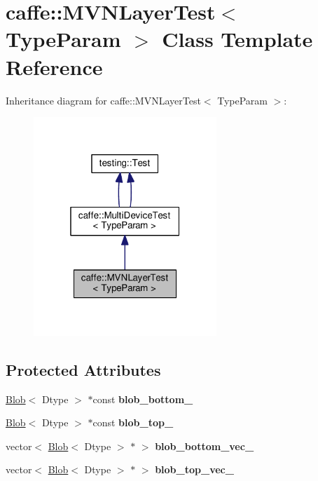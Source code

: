 \hypertarget{classcaffe_1_1_m_v_n_layer_test}{}\section{caffe\+:\+:M\+V\+N\+Layer\+Test$<$ Type\+Param $>$ Class Template Reference}
\label{classcaffe_1_1_m_v_n_layer_test}


Inheritance diagram for caffe\+:\+:M\+V\+N\+Layer\+Test$<$ Type\+Param $>$\+:
\nopagebreak
\begin{figure}[H]
\begin{center}
\leavevmode
\includegraphics[width=196pt]{classcaffe_1_1_m_v_n_layer_test__inherit__graph}
\end{center}
\end{figure}
\subsection*{Protected Attributes}
\begin{DoxyCompactItemize}
\item 
\mbox{\label{classcaffe_1_1_m_v_n_layer_test_ab14e73590a7004e93a62c1aeb59f55e0}} 
\mbox{\hyperlink{classcaffe_1_1_blob}{Blob}}$<$ Dtype $>$ $\ast$const {\bfseries blob\+\_\+bottom\+\_\+}
\item 
\mbox{\label{classcaffe_1_1_m_v_n_layer_test_a774fb72c75043b1a70f0479b84aff195}} 
\mbox{\hyperlink{classcaffe_1_1_blob}{Blob}}$<$ Dtype $>$ $\ast$const {\bfseries blob\+\_\+top\+\_\+}
\item 
\mbox{\label{classcaffe_1_1_m_v_n_layer_test_ad5d5a76f416d686cc004596cbad7d589}} 
vector$<$ \mbox{\hyperlink{classcaffe_1_1_blob}{Blob}}$<$ Dtype $>$ $\ast$ $>$ {\bfseries blob\+\_\+bottom\+\_\+vec\+\_\+}
\item 
\mbox{\label{classcaffe_1_1_m_v_n_layer_test_a558af4e6d5363e48b4b8e5c9b79c9864}} 
vector$<$ \mbox{\hyperlink{classcaffe_1_1_blob}{Blob}}$<$ Dtype $>$ $\ast$ $>$ {\bfseries blob\+\_\+top\+\_\+vec\+\_\+}
\end{DoxyCompactItemize}
